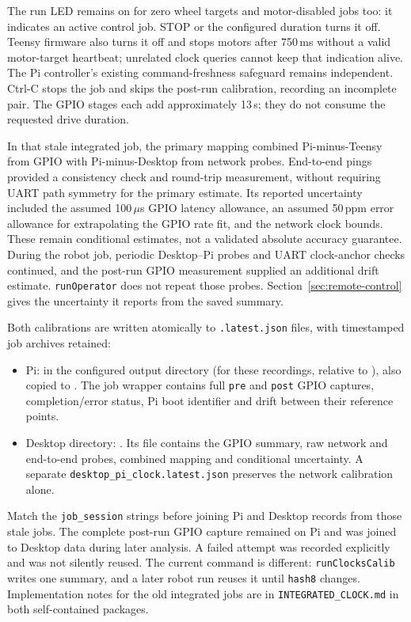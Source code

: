 The run LED remains on for zero wheel targets and motor-disabled jobs too: it indicates an active control job. STOP or the configured duration turns it off. Teensy firmware also turns it off and stops motors after 750\,ms without a valid motor-target heartbeat; unrelated clock queries cannot keep that indication alive. The Pi controller's existing command-freshness safeguard remains independent. Ctrl-C stops the job and skips the post-run calibration, recording an incomplete pair. The GPIO stages each add approximately 13\,s; they do not consume the requested drive duration.

In that stale integrated job, the primary mapping combined Pi-minus-Teensy from GPIO with Pi-minus-Desktop from network probes. End-to-end pings provided a consistency check and round-trip measurement, without requiring UART path symmetry for the primary estimate. Its reported uncertainty included the assumed 100\,$\mu$s GPIO latency allowance, an assumed 50\,ppm error allowance for extrapolating the GPIO rate fit, and the network clock bounds. These remain conditional estimates, not a validated absolute accuracy guarantee. During the robot job, periodic Desktop--Pi probes and UART clock-anchor checks continued, and the post-run GPIO measurement supplied an additional drift estimate. \texttt{runOperator} does not repeat those probes. Section~\ref{sec:remote-control} gives the uncertainty it reports from the saved summary.

Both calibrations are written atomically to \texttt{.latest.json} files, with timestamped job archives retained:
\begingroup\sloppy
\begin{itemize}
\item Pi:  in the configured output directory (for these recordings,  relative to ), also copied to . The job wrapper contains full \texttt{pre} and \texttt{post} GPIO captures, completion/error status, Pi boot identifier and drift between their reference points.
\item Desktop directory: . Its file  contains the GPIO summary, raw network and end-to-end probes, combined mapping and conditional uncertainty. A separate \texttt{desktop\_pi\_clock.latest.json} preserves the network calibration alone.
\end{itemize}
\endgroup
Match the \texttt{job\_session} strings before joining Pi and Desktop records from those stale jobs. The complete post-run GPIO capture remained on Pi and was joined to Desktop data during later analysis. A failed attempt was recorded explicitly and was not silently reused. The current command is different: \texttt{runClocksCalib} writes one summary, and a later robot run reuses it until \texttt{hash8} changes. Implementation notes for the old integrated jobs are in \texttt{INTEGRATED\_CLOCK.md} in both self-contained packages.



